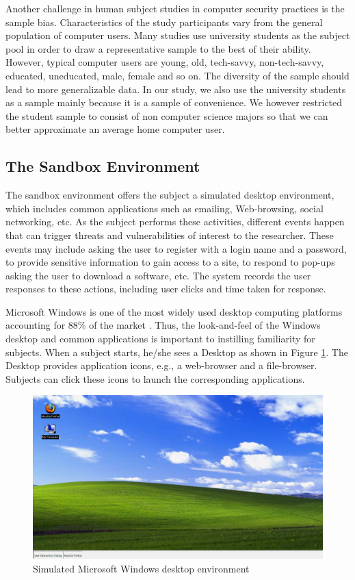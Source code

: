 \documentclass[doctor]{thesis} %
\theoremstyle{plain}
\begin{document}
Another challenge in human subject studies in computer security practices is the sample bias. Characteristics of the study participants vary from the general population of computer users.  Many studies use university students as the subject pool \cite{sotirakopoulos2011, warkentin2016} in order to draw a representative sample to the best of their ability. However, typical computer users are young, old, tech-savvy, non-tech-savvy, educated, uneducated, male, female and so on. The diversity of the sample should lead to more generalizable data. In our study, we also use the university students as a sample mainly because it is a sample of convenience. We however restricted the student sample to consist of non computer science majors so that we can better approximate an average home computer user.

\subsection*{The Sandbox Environment}
The sandbox environment offers the subject a simulated desktop environment, which includes common applications such as emailing, Web-browsing, social networking, etc. As the subject performs these activities, different events happen that can trigger threats and vulnerabilities of interest to the researcher. These events may include asking the user to register with a login name and a password, to provide sensitive information to gain access to a site, to respond to pop-ups asking the user to download a software, etc. The system records the user responses to these actions, including user clicks and time taken for response.

Microsoft Windows is one of the most widely used desktop computing platforms accounting for 88\% of the market \cite{zdnet2020}. Thus, the look-and-feel of the Windows desktop and common applications is important to instilling familiarity for subjects. When a subject starts, he/she sees a Desktop as shown in Figure \ref{fig:desktop}. The Desktop provides application icons, e.g., a web-browser and a file-browser. Subjects can click these icons to launch the corresponding applications.

\begin{figure}[!ht]
  \centering
\includegraphics[width=\columnwidth]{img/desktop.png}
  \caption{Simulated Microsoft Windows desktop environment}
  \label{fig:desktop}
\end{figure}
\end{document}
